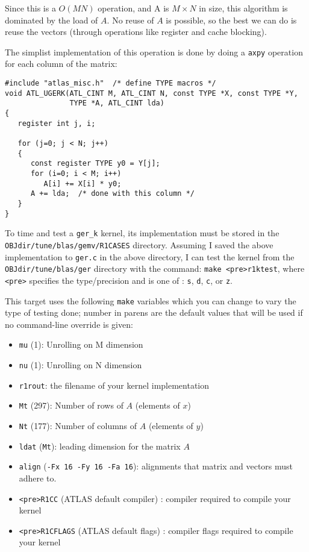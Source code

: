 \documentclass[11pt]{article}
\newcommand{\kernk}[1]{{\tt #1\_k}}
\begin{document}
Since this is a $O(MN)$ operation, and A is $M \times N$ in size,
this algorithm is dominated by the load of $A$.  No reuse of $A$ is
possible, so the best we can do is reuse the vectors (through operations
like register and cache blocking).

The simplist implementation of this operation is done by doing a {\tt axpy}
operation for each column of the matrix:
\begin{verbatim}
#include "atlas_misc.h"  /* define TYPE macros */
void ATL_UGERK(ATL_CINT M, ATL_CINT N, const TYPE *X, const TYPE *Y, 
               TYPE *A, ATL_CINT lda)
{
   register int j, i;
   
   for (j=0; j < N; j++)
   {
      const register TYPE y0 = Y[j];
      for (i=0; i < M; i++)
         A[i] += X[i] * y0;
      A += lda;  /* done with this column */
   }
}
\end{verbatim}

To time and test a \kernk{ger} kernel, its implementation must be stored in 
the\\ {\tt OBJdir/tune/blas/gemv/R1CASES} directory.  Assuming I saved the
above implementation to {\tt ger.c} in the above directory, I can test
the kernel from the {\tt OBJdir/tune/blas/ger} directory with the
command: \verb+make <pre>r1ktest+, where \verb+<pre>+ specifies the
type/precision and is one of : {\tt s}, {\tt d}, {\tt c}, or {\tt z}.

This target uses the following {\tt make} variables which you can change
to vary the type of testing done; number in parens are the default values
that will be used if no command-line override is given:
\begin{itemize}
\item \verb+mu+ (1): Unrolling on M dimension
\item \verb+nu+ (1): Unrolling on N dimension
\item \verb+r1rout+: the filename of your kernel implementation
\item \verb+Mt+ (297): Number of rows of $A$ (elements of $x$)
\item \verb+Nt+ (177): Number of columns of $A$ (elements of $y$)
\item \verb+ldat+ (\verb+Mt+): leading dimension for the matrix $A$
\item \verb+align+ (\verb+-Fx 16 -Fy 16 -Fa 16+): alignments that
      matrix and vectors must adhere to.
\item \verb+<pre>R1CC+ (ATLAS default compiler) : compiler required
      to compile your kernel
\item \verb+<pre>R1CFLAGS+ (ATLAS default flags) : compiler flags required
      to compile your kernel
\end{itemize}
\end{document}
